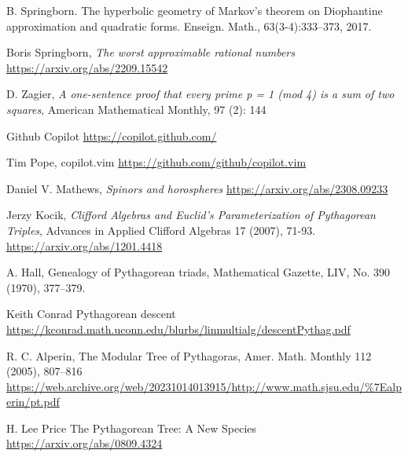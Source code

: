 \documentclass[12pt,a4paper]{amsart}
\begin{document}

B. Springborn. The hyperbolic geometry of Markov’s theorem on Diophantine
approximation and quadratic forms. Enseign. Math., 63(3-4):333–373, 2017.

Boris Springborn,
\textit{The worst approximable rational numbers}
\url{https://arxiv.org/abs/2209.15542}



D. Zagier,
 \textit{A one-sentence proof that every prime p = 1 (mod 4) is a sum of two squares}, 
 American Mathematical Monthly, 97 (2): 144

 Github Copilot \url{https://copilot.github.com/}

Tim Pope, copilot.vim \url{https://github.com/github/copilot.vim}
 

Daniel V. Mathews,
\textit{Spinors and horospheres}
\url{https://arxiv.org/abs/2308.09233}

Jerzy Kocik,
\textit{Clifford Algebras and Euclid's Parameterization of Pythagorean Triples},
Advances in Applied Clifford Algebras 17 (2007), 71-93.
\url{https://arxiv.org/abs/1201.4418}

 A. Hall, 
 Genealogy of Pythagorean triads, 
 Mathematical Gazette, LIV, No. 390
(1970), 377–379.

Keith Conrad
Pythagorean descent
\url{https://kconrad.math.uconn.edu/blurbs/linmultialg/descentPythag.pdf}

 R. C. Alperin, 
 The Modular Tree of Pythagoras,
 Amer. Math. Monthly 112 (2005), 807–816
 \url{https://web.archive.org/web/20231014013915/http://www.math.sjsu.edu/%7Ealperin/pt.pdf}

H. Lee Price
 The Pythagorean Tree: A New Species
 \url{https://arxiv.org/abs/0809.4324}
\end{document}
